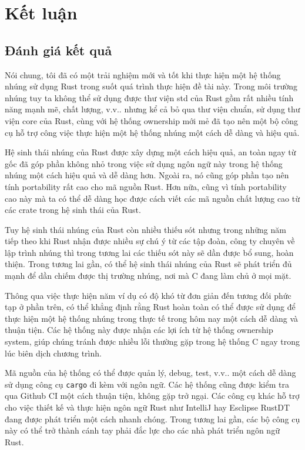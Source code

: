 \chapter{Kết luận}
\section{Đánh giá kết quả}
Nói chung, tôi đã có một trải nghiệm mới và tốt khi thực hiện một hệ thống nhúng sử dụng Rust trong suốt quá trình thực hiện đề tài này.
Trong môi trường nhúng tuy ta không thể sử dụng được thư viện std của Rust gồm rất nhiều tính năng mạnh mẽ, chất lượng, v.v.. nhưng kể cả bỏ qua thư viện chuẩn, sử dụng thư viện core của Rust, cùng với hệ thống ownership mới mẻ đã tạo nên một bộ công cụ hỗ trợ công việc thực hiện một hệ thống nhúng một cách dễ dàng và hiệu quả.

Hệ sinh thái nhúng của Rust được xây dựng một cách hiệu quả, an toàn ngay từ gốc đã góp phần không nhỏ trong việc sử dụng ngôn ngữ này trong hệ thống nhúng một cách hiệu quả và dễ dàng hơn. Ngoài ra, nó cũng góp phần tạo nên tính portability rất cao cho mã nguồn Rust. Hơn nữa, cũng vì tính portability cao này mà ta có thể dễ dàng học được cách viết các mã nguồn chất lượng cao từ các crate trong hệ sinh thái của Rust.

Tuy hệ sinh thái nhúng của Rust còn nhiều thiếu sót nhưng trong những năm tiếp theo khi Rust nhận được nhiều sự chú ý từ các tập đoàn, công ty chuyên về lập trình nhúng thì trong tương lai các thiếu sót này sẽ dần được bổ sung, hoàn thiện. Trong tương lai gần, có thể hệ sinh thái nhúng của Rust sẽ phát triển đủ mạnh để dần chiếm được thị trường nhúng, nơi mà C đang làm chủ ở mọi mặt.

Thông qua việc thực hiện năm ví dụ có độ khó từ đơn giản đến tương đối phức tạp ở phần trên, có thể khẳng định rằng Rust hoàn toàn có thể được sử dụng để thực hiện một hệ thống nhúng trong thực tế trong hôm nay một cách dễ dàng và thuận tiện.
Các hệ thống này được nhận các lợi ích từ hệ thống ownership system, giúp chúng tránh được nhiều lỗi thường gặp trong hệ thống C ngay trong lúc biên dịch chương trình.

Mã nguồn của hệ thống có thể được quản lý, debug, test, v.v.. một cách dễ dàng sử dụng công cụ \texttt{cargo} đi kèm với ngôn ngữ.
Các hệ thống cũng được kiểm tra qua Github CI một cách thuận tiện, không gặp trở ngại.
Các công cụ khác hỗ trợ cho việc thiết kế và thực hiện ngôn ngữ Rust như IntelliJ hay Esclipse RustDT đang được phát triển một cách nhanh chóng.
Trong tương lai gần, các bộ công cụ này có thể trở thành cánh tay phải đắc lực cho các nhà phát triển ngôn ngữ Rust.

